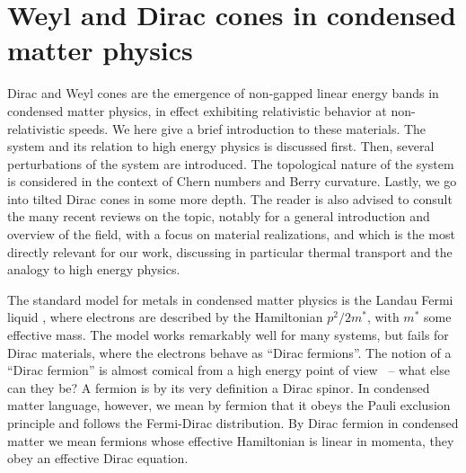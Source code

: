 \section[Weyl and Dirac cones]{Weyl and Dirac cones in condensed matter physics}
\label{sec:weyl-dirac-cones}
Dirac and Weyl cones are the emergence of non-gapped linear energy bands in condensed matter physics, in effect exhibiting relativistic behavior at non-relativistic speeds.
We here give a brief introduction to these materials.
The system and its relation to high energy physics is discussed first.
Then, several perturbations of the system are introduced.
The topological nature of the system is considered in the context of Chern numbers and Berry curvature.
Lastly, we go into tilted Dirac cones in some more depth.
The reader is also advised to consult the many recent reviews on the topic, notably \textcite{armitageWeylDiracSemimetals2018} for a general introduction and overview of the field, \textcite{jiaWeylSemimetalsFermi2016} with a focus on material realizations, and \textcite{chernodubThermalTransportGeometry2021} which is the most directly relevant for our work, discussing in particular thermal transport and the analogy to high energy physics.


The standard model for metals in condensed matter physics is the Landau Fermi liquid \cites{landauTheoryFermiLiquid1956,chernodubThermalTransportGeometry2021}, where electrons are described by the Hamiltonian \( p^2 /2 m^* \), with \( m^* \) some effective mass.
The model works remarkably well for many systems, but fails for Dirac materials, where the electrons behave as ``Dirac fermions''.
The notion of a ``Dirac fermion'' is almost comical from a high energy point of view~\cites{chernodubThermalTransportGeometry2021,vozmedianoTheoreticalPhysicsColloquium2021} -- what else can they be?
A fermion is by its very definition a Dirac spinor.
In condensed matter language, however, we mean by fermion that it obeys the Pauli exclusion principle and follows the Fermi-Dirac distribution.
By Dirac fermion in condensed matter we mean fermions whose effective Hamiltonian is linear in momenta, they obey an effective Dirac equation.

